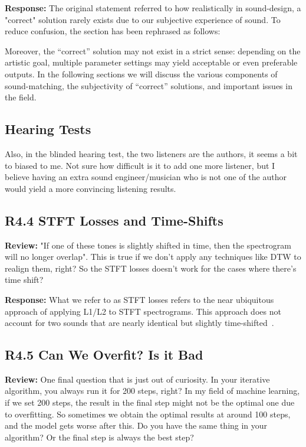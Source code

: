 \documentclass[11pt]{article}
\begin{document}
\noindent\textbf{Response:}
The original statement referred to how realistically in sound-design, a "correct" solution rarely exists due to our subjective experience of sound. To reduce confusion, the section has been rephrased as follows:
\begin{displayquote}
    Moreover, the ``correct'' solution may not exist in a strict sense: depending on the artistic goal, multiple parameter settings may yield acceptable or even preferable outputs.  In the following sections we will discuss the various components of sound-matching, the subjectivity of ``correct'' solutions, and important issues in the field.
\end{displayquote}

\subsection{Hearing Tests}
Also, in the blinded hearing test, the two listeners are the authors, it seems a bit to biased to me. Not sure how difficult is it to add one more listener, but I believe having an extra sound engineer/musician who is not one of the author would yield a more convincing listening results.
\\


\subsection{\textbf{R4.4} STFT Losses and Time-Shifts}
\noindent\textbf{Review:}
"If one of these tones is slightly shifted in time, then the spectrogram will no longer overlap". This is true if we don't apply any techniques like DTW to realign them, right?
So the STFT losses doesn't work for the cases where there's time shift?

\noindent\textbf{Response:}
What we refer to as STFT losses refers to the near ubiquitous approach of applying L1/L2 to STFT spectrograms. This approach does not account for two sounds that are nearly identical but slightly time-shifted~\cite{vahidi2023mesostructures,turian2020sorry}.

\subsection{\textbf{R4.5} Can We Overfit? Is it Bad}
\noindent\textbf{Review:}
One final question that is just out of curiosity.
In your iterative algorithm, you always run it for 200 steps, right?
In my field of machine learning, if we set 200 steps, the result in the final step might not be the optimal one due to overfitting. So sometimes we obtain the optimal results at around 100 steps, and the model gets worse after this.
Do you have the same thing in your algorithm? Or the final step is always the best step?
\end{document}
